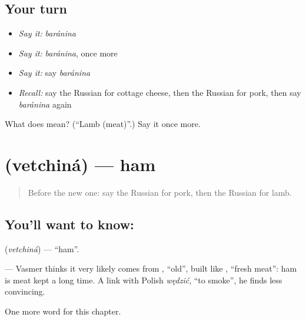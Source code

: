 \subsection*{Your turn}
\begin{itemize}
\raggedright
  \item \emph{Say it:} \emph{baránina}
  \item \emph{Say it:} \emph{baránina}, once more
  \item \emph{Say it:} say \emph{baránina}
  \item \emph{Recall:} say the Russian for cottage cheese, then the Russian for pork, then say \emph{baránina} again
\end{itemize}

\begin{tcolorbox}[breakable,colback=teal!4,colframe=teal!35!black,title={Before you move on}]
What does  mean? (\textquotedblleft{}Lamb (meat)\textquotedblright{}.) Say it once more.
\end{tcolorbox}
\section[\texorpdfstring{\ru{ветчина} (vetchiná)}{ветчина (vetchiná)}]{ (vetchiná) — ham}

\label{lesson:RU-C249-vetchina}



\begin{quote}
Before the new one: say the Russian for pork, then the Russian for lamb.
\end{quote}

\subsection*{You'll want to know: }
\textbf{} (\emph{vetchiná}) — \textquotedblleft{}ham\textquotedblright{}.

\begin{cousinweb}
\textbf{} — Vasmer thinks it very likely comes from \emph{}, \textquotedblleft{}old\textquotedblright{}, built like \emph{}, \textquotedblleft{}fresh meat\textquotedblright{}: ham is meat kept a long time. A link with Polish \emph{wędzić}, \textquotedblleft{}to smoke\textquotedblright{}, he finds less convincing.
\end{cousinweb}

\begin{grammarlens}[title={What you've built}]
One more word for this chapter.
\end{grammarlens}

